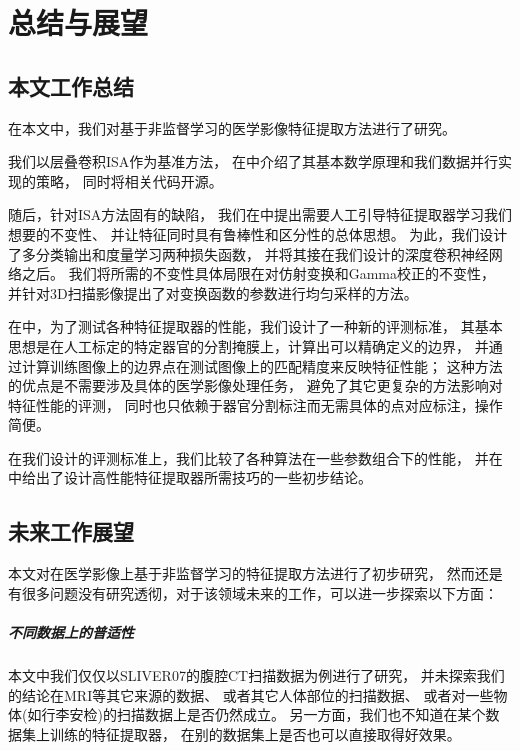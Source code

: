 
\chapter{总结与展望\label{chap:discuss}}

\section{本文工作总结}
在本文中，我们对基于非监督学习的医学影像特征提取方法进行了研究。

我们以层叠卷积ISA作为基准方法，
在中介绍了其基本数学原理和我们数据并行实现的策略，
同时将相关代码开源。

随后，针对ISA方法固有的缺陷，
我们在中提出需要人工引导特征提取器学习我们想要的不变性、
并让特征同时具有鲁棒性和区分性的总体思想。
为此，我们设计了多分类输出和度量学习两种损失函数，
并将其接在我们设计的深度卷积神经网络之后。
我们将所需的不变性具体局限在对仿射变换和Gamma校正的不变性，
并针对3D扫描影像提出了对变换函数的参数进行均匀采样的方法。

在中，为了测试各种特征提取器的性能，我们设计了一种新的评测标准，
其基本思想是在人工标定的特定器官的分割掩膜上，计算出可以精确定义的边界，
并通过计算训练图像上的边界点在测试图像上的匹配精度来反映特征性能；
这种方法的优点是不需要涉及具体的医学影像处理任务，
避免了其它更复杂的方法影响对特征性能的评测，
同时也只依赖于器官分割标注而无需具体的点对应标注，操作简便。

在我们设计的评测标准上，我们比较了各种算法在一些参数组合下的性能，
并在中给出了设计高性能特征提取器所需技巧的一些初步结论。

\section{未来工作展望}
本文对在医学影像上基于非监督学习的特征提取方法进行了初步研究，
然而还是有很多问题没有研究透彻，对于该领域未来的工作，可以进一步探索以下方面：

\paragraph{不同数据上的普适性}
本文中我们仅仅以SLIVER07的腹腔CT扫描数据为例进行了研究，
并未探索我们的结论在MRI等其它来源的数据、
或者其它人体部位的扫描数据、
或者对一些物体(如行李安检)的扫描数据上是否仍然成立。
另一方面，我们也不知道在某个数据集上训练的特征提取器，
在别的数据集上是否也可以直接取得好效果。

